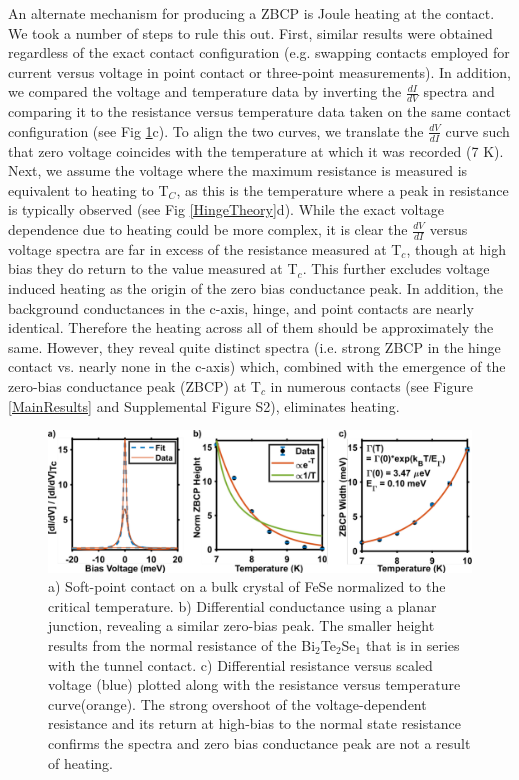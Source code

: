 An alternate mechanism for producing a ZBCP is Joule heating at the contact. We took a number of steps to rule this out. First, similar results were obtained regardless of the exact contact configuration (e.g. swapping contacts employed for current versus voltage in point contact or three-point measurements). In addition, we compared the voltage and temperature data by inverting the $\frac{dI}{dV}$ spectra and comparing it to the resistance versus temperature data taken on the same contact configuration (see Fig \ref{Controls}c). To align the two curves, we translate the $\frac{dV}{dI}$ curve such that zero voltage coincides with the temperature at which it was recorded (7 K). Next, we assume the voltage where the maximum resistance is measured is equivalent to heating to T$_{C}$, as this is the temperature where a peak in resistance is typically observed (see Fig \ref{HingeTheory}d). While the exact voltage dependence due to heating could be more complex, it is clear the $\frac{dV}{dI}$ versus voltage spectra are far in excess of the resistance measured at T$_{c}$, though at high bias they do return to the value measured at T$_{c}$. This further excludes voltage induced heating as the origin of the zero bias conductance peak. In addition, the background conductances in the c-axis, hinge, and point contacts are nearly identical. Therefore the heating across all of them should be approximately the same. However, they reveal quite distinct spectra (i.e. strong ZBCP in the hinge contact vs. nearly none in the c-axis) which, combined with the emergence of the zero-bias conductance peak (ZBCP) at T$_{c}$ in numerous contacts (see Figure \ref{MainResults} and Supplemental Figure S2), eliminates heating.
\par
\begin{figure}[H]
    \centering
    \includegraphics[width=\textwidth]{Chap3/Figures/Figure4.pdf}
    \caption{a) Soft-point contact on a bulk crystal of FeSe normalized to the critical temperature. b) Differential conductance using a planar junction, revealing a similar zero-bias peak. The smaller height results from the normal resistance of the Bi$_{2}$Te$_{2}$Se$_{1}$ that is in series with the tunnel contact. c) Differential resistance versus scaled voltage (blue) plotted along with the resistance versus temperature curve(orange). The strong overshoot of the voltage-dependent resistance and its return at high-bias to the normal state resistance confirms the spectra and zero bias conductance peak are not a result of heating.}
    \label{Controls}
\end{figure}

